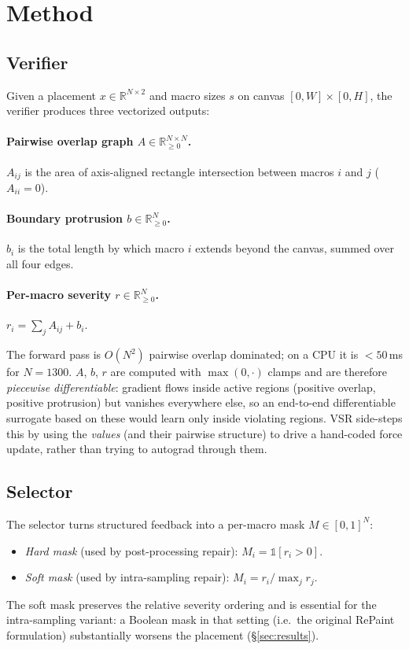 \documentclass{article}
\begin{document}
\section{Method}
\label{sec:method}

\subsection{Verifier}
\label{sec:verifier}

Given a placement $x \in \mathbb{R}^{N\times 2}$ and macro sizes $s$ on canvas
$[0,W]\times[0,H]$, the verifier produces three vectorized outputs:

\paragraph{Pairwise overlap graph $A \in \mathbb{R}^{N\times N}_{\geq 0}$.}
$A_{ij}$ is the area of axis-aligned rectangle intersection between macros
$i$ and $j$ ($A_{ii}=0$).
\paragraph{Boundary protrusion $b \in \mathbb{R}^{N}_{\geq 0}$.}  $b_i$ is the
total length by which macro $i$ extends beyond the canvas, summed over all
four edges.
\paragraph{Per-macro severity $r \in \mathbb{R}^{N}_{\geq 0}$.}  $r_i =
\sum_j A_{ij} + b_i$.

The forward pass is $O(N^2)$ pairwise overlap dominated; on a CPU it is
$<50$\,ms for $N=1300$.  $A$, $b$, $r$ are computed with $\max(0,\cdot)$
clamps and are therefore \emph{piecewise differentiable}: gradient flows
inside active regions (positive overlap, positive protrusion) but
vanishes everywhere else, so an end-to-end differentiable surrogate
based on these would learn only inside violating regions.  VSR side-steps
this by using the \emph{values} (and their pairwise structure) to drive
a hand-coded force update, rather than trying to autograd through them.

\subsection{Selector}
The selector turns structured feedback into a per-macro mask
$M \in [0,1]^N$:
\begin{itemize}
\item \emph{Hard mask} (used by post-processing repair): $M_i = \mathbb{1}[r_i > 0]$.
\item \emph{Soft mask} (used by intra-sampling repair):
$M_i = r_i / \max_j r_j$.
\end{itemize}
The soft mask preserves the relative severity ordering and is essential for
the intra-sampling variant: a Boolean mask in that setting (i.e.\ the original
RePaint formulation) substantially worsens the placement
(\S\ref{sec:results}).
\end{document}
